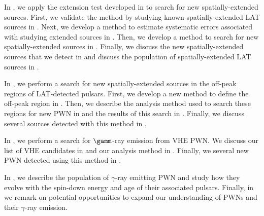 In , we apply the extension test developed in
 to search for new spatially-extended sources.
First, we validate the method by studying known spatially-extended
\ac{LAT} sources in .  Next, we develop
a method to estimate systematic errors associated with studying
extended sources in .  Then,
we develop a method to search for new spatially-extended sources in
.  Finally, we discuss the new
spatially-extended sources that we detect in 
and discuss the population of spatially-extended \ac{LAT} sources in
.


In , we perform a search for new spatially-extended
sources in the off-peak regions of \ac{LAT}-detected pulsars.
First, we develop a new method to define the off-peak region in
.  Then, we describe the analysis method used to
search these regions for new \ac{PWN} in 
and the results of this search in .
Finally, we discuss several sources detected with this method in
.

In , we perform a search for $\gamm$-ray emission
from \ac{VHE} \ac{PWN}.  We discuss our list of \ac{VHE} candidates
in  and our analysis method
in .  Finally, we several new \ac{PWN}
detected using this method in .


In , we describe the population of $\gamma$-ray
emitting \ac{PWN} and study how they evolve with the spin-down energy
and age of their associated pulsars.  Finally, in 
we remark on potential opportunities to expand our understanding of
\acp{PWN} and their $\gamma$-ray emission.
